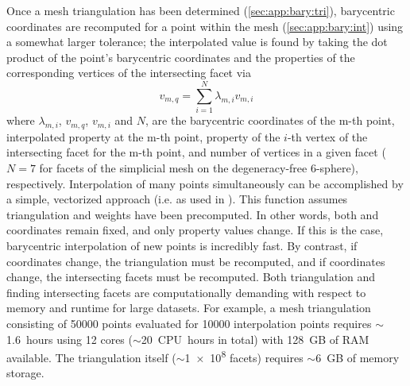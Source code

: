 \documentclass[final,12pt]{elsarticle}
\begin{document}
Once a mesh triangulation has been determined (\cref{sec:app:bary:tri}), barycentric coordinates are recomputed for a \outpt{} point within the \inpt{} mesh (\cref{sec:app:bary:int}) using a somewhat larger tolerance; the interpolated value is found by taking the dot product of the \outpt{} point's barycentric coordinates and the properties of the corresponding vertices of the intersecting facet via
\begin{equation}
	\label{eq:bary-interp}
	v_{m,q}=\underset{i=1}{\overset{N}{\sum }}\lambda _{m,i} v_{m,i}
\end{equation}
where $\lambda_{m,i}$, $v_{m,q}$, $v_{m,i}$ and $N$, are the barycentric coordinates of the m-th \outpt{} point, interpolated property at the m-th \outpt{} point, property of the $i$-th vertex of the intersecting facet for the m-th \outpt{} point, and number of vertices in a given facet ($N = 7$ for facets of the simplicial mesh on the degeneracy-free 6-sphere), respectively. Interpolation of many \outpt{} points simultaneously can be accomplished by a simple, vectorized approach (i.e.  as used in ). This function assumes triangulation and weights have been precomputed. In other words, both \inpt{} and \outpt{} coordinates remain fixed, and only \inpt{} property values change. If this is the case, barycentric interpolation of new points is incredibly fast. By contrast, if \inpt{} coordinates change, the triangulation must be recomputed, and if \outpt{} coordinates change, the intersecting facets must be recomputed. Both triangulation and finding intersecting facets are computationally demanding with respect to memory and runtime for large datasets. For example, a mesh triangulation consisting of \num{50000} points evaluated for \num{10000} interpolation points requires $\sim$1.6~hours using 12 cores ($\sim$20~CPU~hours in total) with \num{128}~GB of RAM available. The triangulation itself ($\sim$\num{1e8} facets) requires $\sim$6~GB of memory storage.
\end{document}
